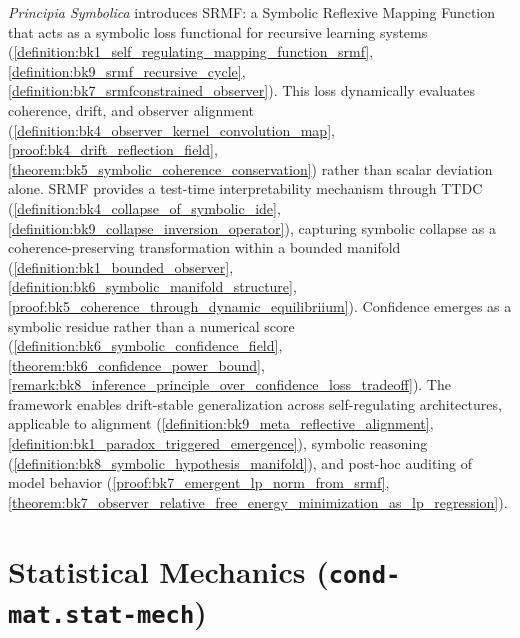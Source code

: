 \emph{Principia Symbolica} introduces SRMF: a Symbolic Reflexive Mapping Function that acts as a symbolic loss functional for recursive learning systems (\ref{definition:bk1_self_regulating_mapping_function_srmf}, \ref{definition:bk9_srmf_recursive_cycle}, \ref{definition:bk7_srmfconstrained_observer}). This loss dynamically evaluates coherence, drift, and observer alignment (\ref{definition:bk4_observer_kernel_convolution_map}, \ref{proof:bk4_drift_reflection_field}, \ref{theorem:bk5_symbolic_coherence_conservation}) rather than scalar deviation alone. SRMF provides a test-time interpretability mechanism through TTDC (\ref{definition:bk4_collapse_of_symbolic_ide}, \ref{definition:bk9_collapse_inversion_operator}), capturing symbolic collapse as a coherence-preserving transformation within a bounded manifold (\ref{definition:bk1_bounded_observer}, \ref{definition:bk6_symbolic_manifold_structure}, \ref{proof:bk5_coherence_through_dynamic_equilibriium}). Confidence emerges as a symbolic residue rather than a numerical score (\ref{definition:bk6_symbolic_confidence_field}, \ref{theorem:bk6_confidence_power_bound}, \ref{remark:bk8_inference_principle_over_confidence_loss_tradeoff}). The framework enables drift-stable generalization across self-regulating architectures, applicable to alignment (\ref{definition:bk9_meta_reflective_alignment}, \ref{definition:bk1_paradox_triggered_emergence}), symbolic reasoning (\ref{definition:bk8_symbolic_hypothesis_manifold}), and post-hoc auditing of model behavior (\ref{proof:bk7_emergent_lp_norm_from_srmf}, \ref{theorem:bk7_observer_relative_free_energy_minimization_as_lp_regression}).

\section*{Statistical Mechanics (\texttt{cond-mat.stat-mech})}
\label{abs:thermo}

